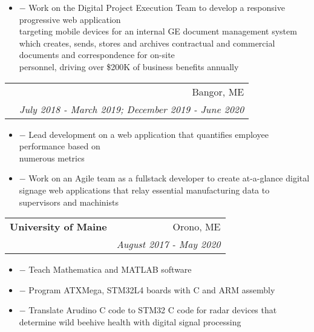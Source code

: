 \documentclass[10pt]{article}
\newcommand{\fancyunderline}[1]{%
    \uline{\phantom{#1}}%
    \llap{\contour{white}{#1}}%
}
\newenvironment{details}
{ \begin{itemize}
    \setlength{\itemsep}{0pt}
    \setlength{\parskip}{0pt}
    \setlength{\parsep}{0pt}     
}
{ \end{itemize}}
\begin{document}
    \begin{details}
        \item[$-$] Work on the Digital Project Execution Team to develop a responsive progressive web application \\ targeting mobile devices for an internal GE document management system which creates, sends, stores and archives contractual and commercial documents and correspondence for on-site \\ personnel, driving over \$200K of business benefits annually 
    \end{details}
    \vspace{-10pt}
    \begin{tabular*}{1.015\textwidth}{l@{\extracolsep{\fill}}r}
        \hspace{-5pt} & Bangor, ME \\
        \hspace{-7.5pt} \fancyunderline{GE Power Early Identification Intern} & \textit{\small July 2018 - March 2019; December 2019 - June 2020} \\
    \end{tabular*}\vspace{-2.5pt}
    \begin{details}
        \item[$-$] Lead development on a web application that quantifies employee performance based on\\ numerous metrics
        \item[$-$] Work on an Agile team as a fullstack developer to create at-a-glance digital signage web applications that relay essential manufacturing data to supervisors and machinists
    \end{details}

\vspace{4pt}
    \begin{tabular*}{1.015\textwidth}{l@{\extracolsep{\fill}}r}
        \hspace{-5pt}\textbf{\large University of Maine} & Orono, ME \\
        \hspace{-7.5pt} \fancyunderline{Teaching \& Research Assistant: College of Electrical and Computer Engineering} & \textit{\small August 2017 - May 2020} \\
    \end{tabular*}\vspace{-2.5pt}
    \begin{details}
        \item[$-$] Teach Mathematica and MATLAB software
        \item[$-$] Program ATXMega, STM32L4 boards with C and ARM assembly
        \item[$-$] Translate Arudino C code to STM32 C code for radar devices that determine wild beehive health with digital signal processing
    \end{details}
\end{document}
